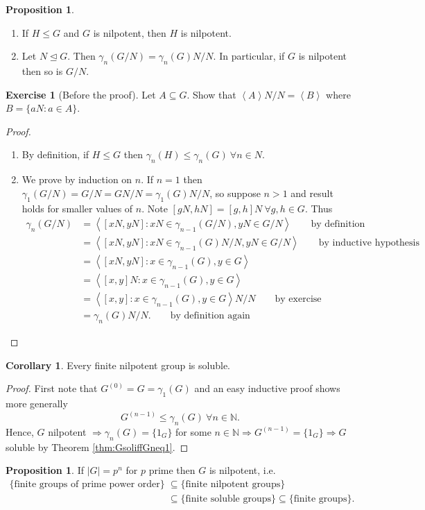 \documentclass[a4paper]{article}
\newcommand{\la}{\left\langle}
\newcommand{\ra}{\right\rangle}
\newcommand{\N}{\mathbb{N}}
\theoremstyle{definition}
\newtheorem{prop}[defn]{Proposition}
\newtheorem{coro}[defn]{Corollary}
\newtheorem{exe}[defn]{Exercise}
\begin{document}
\begin{prop}
\begin{enumerate}
\item If $H\leq G$ and $G$ is nilpotent, then $H$ is nilpotent.
\item Let $N\unlhd G$. Then $\gamma_n(G/N)=\gamma_n(G)N/N$. In particular, if $G$ is nilpotent then so is $G/N$.
\end{enumerate}
\end{prop}
\begin{exe}[Before the proof]
Let $A\subseteq G$. Show that $\la A\ra N/N=\la B\ra$ where $B=\{aN:a\in A\}$.
\end{exe}
\begin{proof}
\begin{enumerate}
\item By definition, if $H\leq G$ then $\gamma_n(H)\leq\gamma_n(G) \ \forall n\in N$.
\item We prove by induction on $n$. If $n=1$ then $\gamma_1(G/N)=G/N=GN/N=\gamma_1(G)N/N$, so suppose $n>1$ and result holds for smaller values of $n$. Note $[gN,hN]=[g,h]N \ \forall g,h\in G$. Thus
\[
\begin{aligned}
\gamma_n(G/N)&=\la [xN,yN]:xN\in\gamma_{n-1}(G/N),yN\in G/N\ra \qquad \text{by definition}\\
&=\la [xN,yN]:xN\in\gamma_{n-1}(G)N/N,yN\in G/N \ra \qquad \text{by inductive hypothesis} \\
&=\la[xN,yN]:x\in\gamma_{n-1}(G),y\in G\ra \\
&=\la[x,y]N:x\in\gamma_{n-1}(G),y\in G\ra \\
&=\la[x,y]:x\in\gamma_{n-1}(G),y\in G\ra N/N\qquad\text{by exercise} \\
&=\gamma_n(G)N/N. \qquad\text{by definition again}
\end{aligned}
\]
\end{enumerate}
\end{proof}

\begin{coro}
Every finite nilpotent group is soluble.
\end{coro}
\begin{proof}
First note that $G^{(0)}=G=\gamma_1(G)$ and an easy inductive proof shows more generally
\[
G^{(n-1)}\leq \gamma_n(G) \ \forall n\in \N.
\]
Hence, $G$ nilpotent $\Rightarrow \gamma_n(G)=\{1_G\}$ for some $n\in \N\Rightarrow G^{(n-1)}=\{1_G\}\Rightarrow G$ soluble by Theorem \ref{thm:GsoliffGneq1}.
\end{proof}

\begin{prop}
If $|G|=p^n$ for $p$ prime then $G$ is nilpotent, i.e.
\[
\begin{aligned}
\{\text{finite groups of prime power order}\}&\subseteq\{\text{finite nilpotent groups}\}\\&\subseteq\{\text{finite soluble groups}\}\subseteq\{\text{finite groups}\}.
\end{aligned}
\]
\end{prop}
\end{document}
